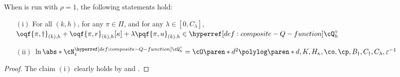 \begin{lemma}\label{lemma:composite-Q-cover}
When  is run with $\rho =1$, the following statements hold:
\begin{itemize}
    \item[$(\mathrm{i})$] For all $(k, h)$, for any $\pi \in \Pi$, and for any $\lambda \in [0, C_\lambda]$,  
\(
\oqf{\pi, \dagger}_{(k), h} + \oqf{\pi, r}_{(k), h}[\kappa] + \lambda \pqf{\pi, u}_{(k), h} \in \Qcomp_h
\)
    \item[$(\mathrm{ii})$]
    \(
\ln \abs*{\cN^{\Qcomp_h}_{\varepsilon}} = 
\cO\paren*{d^2} 
\polylog\paren*{d, K, H_\kappa, \co, \cp, B_\dagger, C_\dagger,C_\lambda,\varepsilon^{-1}}
\)
\end{itemize}
\end{lemma}
\begin{proof}
The claim $(\mathrm{i})$ clearly holds by  and .


\end{proof}

